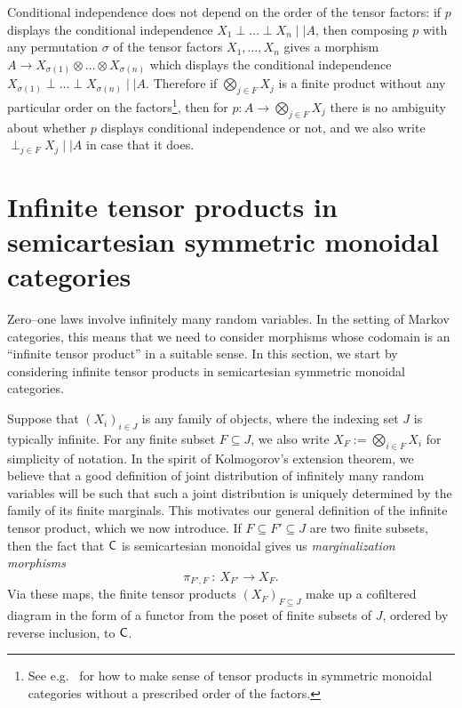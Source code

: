 \documentclass[11pt]{article}
\begin{document}
Conditional independence does not depend on the order of the tensor factors: if $p$ displays the conditional independence $X_1 \perp \ldots \perp X_n \mid\mid A$, then composing $p$ with any permutation $\sigma$ of the tensor factors $X_1,\ldots,X_n$ gives a morphism $A \to X_{\sigma(1)} \otimes \ldots \otimes X_{\sigma(n)}$ which displays the conditional independence $X_{\sigma(1)} \perp \ldots \perp X_{\sigma(n)} \mid\mid A$. Therefore if $\bigotimes_{j \in F} X_j$ is a finite product without any particular order on the factors\footnote{See e.g.~\cite[Proposition~II.1.5]{DMOS} for how to make sense of tensor products in symmetric monoidal categories without a prescribed order of the factors.}, then for $p : A \to \bigotimes_{j \in F} X_j$ there is no ambiguity about whether $p$ displays conditional independence or not, and we also write $\perp_{j \in F} X_j \mid\mid A$ in case that it does.

\section{Infinite tensor products in semicartesian symmetric monoidal categories}
\label{infprod_semicartesian}

Zero--one laws involve infinitely many random variables. In the setting of Markov categories, this means that we need to consider morphisms whose codomain is an ``infinite tensor product'' in a suitable sense. In this section, we start by considering infinite tensor products in semicartesian symmetric monoidal categories.

Suppose that $(X_i)_{i \in J}$ is any family of objects, where the indexing set $J$ is typically infinite. For any finite subset $F \subseteq J$, we also write $X_F := \bigotimes_{i \in F} X_i$ for simplicity of notation. In the spirit of Kolmogorov's extension theorem, we believe that a good definition of joint distribution of infinitely many random variables will be such that such a joint distribution is uniquely determined by the family of its finite marginals. This motivates our general definition of the infinite tensor product, which we now introduce. If $F \subseteq F' \subseteq J$ are two finite subsets, then the fact that $\mathsf{C}$ is semicartesian monoidal gives us \emph{marginalization morphisms}
\[
	\pi_{F',F} \: : \: X_{F'} \longrightarrow X_F.
\]
Via these maps, the finite tensor products $(X_F)_{F \subseteq J}$ make up a cofiltered diagram in the form of a functor from the poset of finite subsets of $J$, ordered by reverse inclusion, to $\mathsf{C}$.
\end{document}
